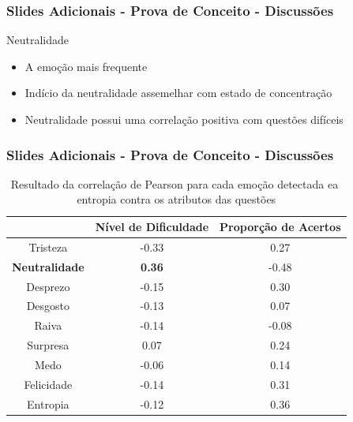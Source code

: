 \begin{frame}
\frametitle{Slides Adicionais - Prova de Conceito - Discussões}
\begin{block}{Neutralidade}
\begin{itemize}
\pause
\item A emo\c{c}\~ao mais frequente
\pause
\item Ind\'{i}cio da neutralidade assemelhar com estado de concentra\c{c}\~ao
\pause
\item Neutralidade possui uma correla\c{c}\~ao positiva com quest\~oes dif\'{i}ceis

\end{itemize}
\end{block}

\end{frame}

\begin{frame}
\frametitle{Slides Adicionais - Prova de Conceito - Discussões}
\begin{table}[]\footnotesize
\centering
\caption{Resultado​ ​da​ ​correla\c{c}\~ao​ ​de​ ​Pearson​ ​para​ ​cada​ ​emo\c{c}\~ao​ ​detectada
e​ ​a​ ​entropia​ ​contra​ ​os​ ​atributos​ ​das​ ​quest\~oes}
\label{my-label}
\begin{tabular}{|c|c|c|}
\hline
                      & \textbf{Nível de Dificuldade} & \textbf{Proporção de Acertos} \\ \hline
Tristeza	     & -0.33                & 0.27                          \\ \hline
\small \textbf{Neutralidade} & \small \textbf{0.36}                 & -0.48                \\ \hline
Desprezo     		& -0.15                         & 0.30                 \\ \hline
Desgosto              & -0.13                         & 0.07                          \\ \hline
Raiva                 & -0.14                         & -0.08                         \\ \hline
Surpresa              & 0.07                          & 0.24                          \\ \hline
Medo                  & -0.06                         & 0.14                          \\ \hline
Felicidade   		& -0.14                         & 0.31                 \\ \hline
Entropia     		& -0.12                         & 0.36                 \\ \hline
\end{tabular}
\end{table}
\end{frame}




